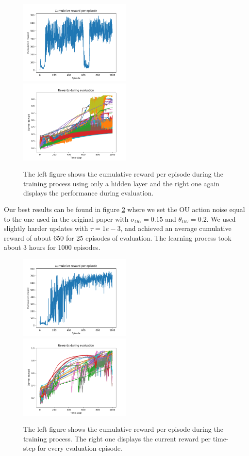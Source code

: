 \begin{figure}[H]
	\includegraphics[width=0.5\textwidth]{plots/ddpg_ball_1layer_train.png}
	\includegraphics[width=0.5\textwidth]{plots/ddpg_ball_1layer_eval.png}
	\caption{The left figure shows the cumulative reward per episode during the training process using only a hidden layer and the right one again displays the performance during evaluation.}
	\label{ddpg:ball:gamma}
\end{figure}
Our best results can be found in figure \ref{ddpg:ball:best} where we set the OU action noise equal to the one used in the original paper with $\sigma_{OU}=0.15$ and $\theta_{OU}=0.2$. We used slightly harder updates with $\tau=1e-3$, and achieved an average cumulative reward of about 650 for 25 episodes of evaluation. The learning process took about 3 hours for 1000 episodes.
\begin{figure}[H]
	\includegraphics[width=0.5\textwidth]{plots/ddpg_ball_best_train.png}
	\includegraphics[width=0.5\textwidth]{plots/ddpg_ball_best_eval.png}
	\caption{The left figure shows the cumulative reward per episode during the training process. The right one displays the current reward per time-step for every evaluation episode.}
	\label{ddpg:ball:best}
\end{figure}
